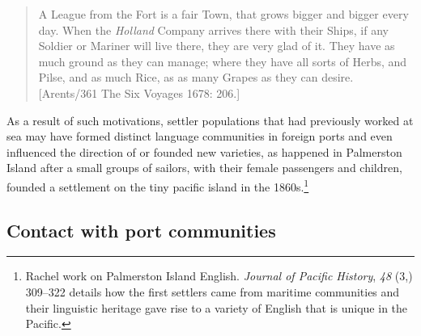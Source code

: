 \begin{quotation}
A League from the Fort is a fair Town, that grows bigger and bigger every day. When the \textit{Holland} Company arrives there with their Ships, if any Soldier or Mariner will live there, they are very glad of it. They have as much ground as they can manage; where they have all sorts of Herbs, and Pilse, and as much Rice, as as many Grapes as they can desire. [Arents/361 The Six {Voyages 1678}: 206.]
\end{quotation}

As a result of such motivations, settler populations that had previously worked at sea may have formed distinct language communities in foreign ports and even influenced the direction of  or founded new varieties, as happened in Palmerston Island after a small groups of sailors, with their female passengers and children, founded a settlement on the tiny pacific island in the 1860s.\footnote{Rachel  work on Palmerston Island English. \textit{Journal of Pacific History}, \textit{48} (3,) 309–322 details how the first settlers came from maritime communities and their linguistic heritage gave rise to a variety of English that is unique in the Pacific.} 

\subsection{{Contact with port communities}}%

